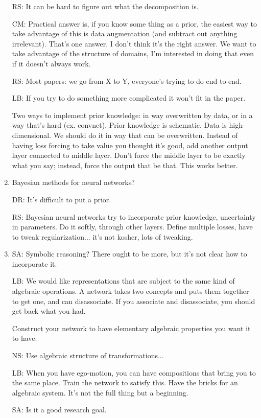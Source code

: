 \begin{enumerate}
RS: It can be hard to figure out what the decomposition is.

CM: Practical answer is, if you know some thing as a prior, the easiest way to take advantage of this is data augmentation (and subtract out anything irrelevant). That's one answer, I don't think it's the right answer. We want to take advantage of the structure of domains, I'm interested in doing that even if it doesn't always work.

RS: Most papers: we go from X to Y, everyone's trying to do end-to-end.

LB: If you try to do something more complicated it won't fit in the paper. 

Two ways to implement prior knowledge: in way overwritten by data, or in a way that's hard (ex. convnet). Prior knowledge is schematic. Data is high-dimensional. We should do it in way that can be overwritten. Instead of having loss forcing to take value you thought it's good, add another output layer connected to middle layer. Don't force the middle layer to be exactly what you say; instead, force the output that be that. This works better.
\item
Bayesian methods for neural networks?

DR: It's difficult to put a prior.

RS: Bayesian neural networks try to incorporate prior knowledge, uncertainty in parameters. Do it softly, through other layers. Define multiple losses, have to tweak regularization... it's not kosher, lots of tweaking.

\item
SA: Symbolic reasoning? There ought to be more, but it's not clear how to incorporate it.

LB: We would like representations that are subject to the same kind of algebraic operations. A network takes two concepts and puts them together to get one, and can disassociate. If you associate and disassociate, you should get back what you had.

Construct your network to have elementary algebraic properties you want it to have.

NS: Use algebraic structure of transformations...

LB: When you have ego-motion, you can have compositions that bring you to the same place. Train the network to satisfy this. Have the bricks for an algebraic system. It's not the full thing but a beginning.

SA: Is it a good research goal.


\end{enumerate}
